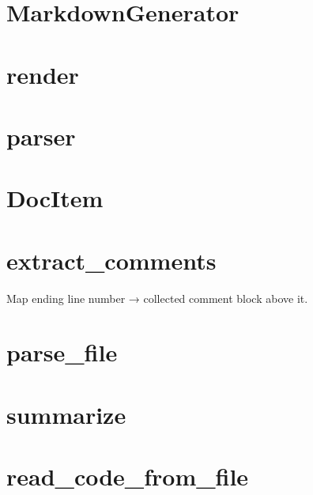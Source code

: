 \documentclass{article}
\begin{document}
\section{MarkdownGenerator}








\section{render}








\section{parser}








\section{DocItem}








\section{extract_comments}


Map ending line number → collected comment block above it.







\section{parse_file}








\section{summarize}








\section{read_code_from_file}
\end{document}
